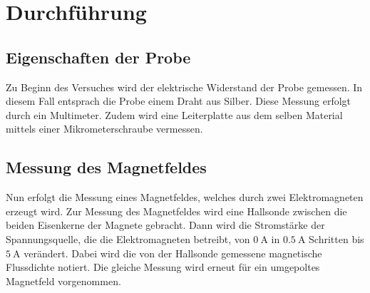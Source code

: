 \section{Durchführung}
\label{sec:Durchführung}
\subsection{Eigenschaften der Probe}
Zu Beginn des Versuches wird der elektrische Widerstand der Probe gemessen. In diesem Fall entsprach die Probe 
einem Draht aus Silber. Diese Messung erfolgt durch ein Multimeter.
Zudem wird eine Leiterplatte aus dem selben Material mittels einer Mikrometerschraube vermessen.
\subsection{Messung des Magnetfeldes}
Nun erfolgt die Messung eines Magnetfeldes, welches durch zwei Elektromagneten erzeugt wird. Zur Messung des 
Magnetfeldes wird eine Hallsonde zwischen die beiden Eisenkerne der Magnete gebracht. Dann wird die Stromstärke der
Spannungsquelle, die die Elektromagneten betreibt, von $\SI{0}{\ampere}$ in $\SI{0.5}{\ampere}$
Schritten bis $\SI{5}{\ampere}$ verändert. Dabei wird die von der Hallsonde gemessene magnetische Flussdichte
notiert. Die gleiche Messung wird erneut für ein umgepoltes Magnetfeld vorgenommen.
